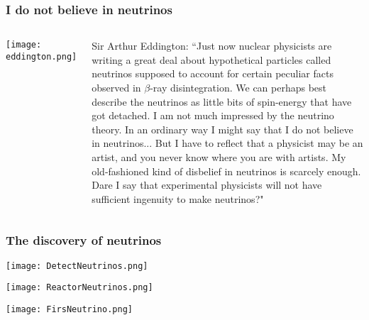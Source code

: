 \begin{frame}
\frametitle{I do not believe in neutrinos}
\begin{columns}
\texttt{[image: eddington.png]}
 
Sir Arthur Eddington: ``Just now nuclear physicists are writing a great deal about hypothetical particles called neutrinos supposed to account for certain peculiar facts observed in $\beta$-ray disintegration. We can perhaps best describe the neutrinos as little bits of spin-energy that have got detached. I am not much impressed by the neutrino theory. \alert{In an ordinary way I might say that I do not believe in neutrinos}... But I have to reflect that a physicist may be an artist, and you never know where you are with artists. My old-fashioned kind of disbelief in neutrinos is scarcely enough. \alert{Dare I say that experimental physicists will not have sufficient ingenuity to make neutrinos?"}

\end{columns}
\end{frame}

\begin{frame}
\frametitle{The discovery of neutrinos}

\texttt{[image: DetectNeutrinos.png]}

\end{frame}

\begin{frame}

\texttt{[image: ReactorNeutrinos.png]}

\end{frame}

\begin{frame}

\texttt{[image: FirsNeutrino.png]}

\end{frame}

